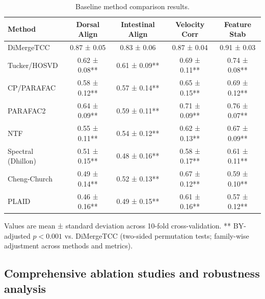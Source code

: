 \documentclass[unnumsec,webpdf,modern,large,namedate]{oup-authoring-template}%
\theoremstyle{thmstyleone}\newtheorem{theorem}{Theorem}
\theoremstyle{thmstyletwo}\newtheorem{example}{Example}
\theoremstyle{thmstylethree}\newtheorem{definition}{Definition}
\begin{document}
\begin{table}[t]
\centering
\caption{Baseline method comparison results.}
\label{tab:baseline_comparison}
\begin{tabular}{lcccc}
\toprule
\textbf{Method} & \textbf{Dorsal Align} & \textbf{Intestinal Align} & \textbf{Velocity Corr} & \textbf{Feature Stab} \\
\midrule
DiMergeTCC & 0.87 ± 0.05 & 0.83 ± 0.06 & 0.87 ± 0.04 & 0.91 ± 0.03 \\
Tucker/HOSVD & 0.62 ± 0.08** & 0.61 ± 0.09** & 0.69 ± 0.11** & 0.74 ± 0.08** \\
CP/PARAFAC & 0.58 ± 0.12** & 0.57 ± 0.14** & 0.65 ± 0.15** & 0.69 ± 0.12** \\
PARAFAC2 & 0.64 ± 0.09** & 0.59 ± 0.11** & 0.71 ± 0.09** & 0.76 ± 0.07** \\
NTF & 0.55 ± 0.11** & 0.54 ± 0.12** & 0.62 ± 0.13** & 0.67 ± 0.09** \\
Spectral (Dhillon) & 0.51 ± 0.15** & 0.48 ± 0.16** & 0.58 ± 0.17** & 0.61 ± 0.11** \\
Cheng-Church & 0.49 ± 0.14** & 0.52 ± 0.13** & 0.67 ± 0.12** & 0.59 ± 0.10** \\
PLAID & 0.46 ± 0.16** & 0.49 ± 0.15** & 0.61 ± 0.16** & 0.57 ± 0.12** \\
\bottomrule
\end{tabular}
\begin{tablenotes}
Values are mean ± standard deviation across 10-fold cross-validation. 
** BY-adjusted $p < 0.001$ vs. DiMergeTCC (two-sided permutation tests; family-wise adjustment across methods and metrics).
\end{tablenotes}
\end{table}

\subsection{Comprehensive ablation studies and robustness analysis}
\label{subsec:val_robust}
\end{document}
